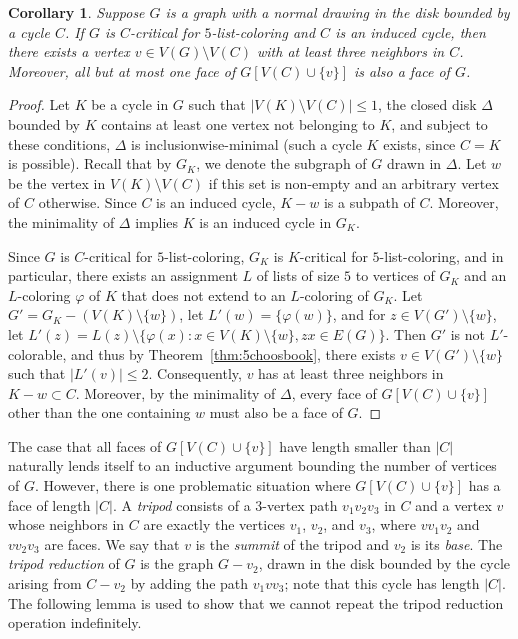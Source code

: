 \documentclass[12pt,twoside,openright,a4paper]{book}
\newtheorem{corollary}[theorem]{Corollary}
\begin{document}
\begin{corollary}\label{cor:tripod}
Suppose $G$ is a graph with a normal drawing in the disk bounded by a cycle $C$.
If $G$ is $C$-critical for $5$-list-coloring and $C$ is an induced cycle, then
there exists a vertex $v\in V(G)\setminus V(C)$ with at least three neighbors in $C$.
Moreover, all but at most one face of $G[V(C)\cup\{v\}]$ is also a face of $G$.
\end{corollary}
\begin{proof}
Let $K$ be a cycle in $G$ such that $|V(K)\setminus V(C)|\le 1$, the closed disk $\Delta$ bounded
by $K$ contains at least one vertex not belonging to $K$, and subject to these conditions, $\Delta$ is inclusionwise-minimal
(such a cycle $K$ exists, since $C=K$ is possible).  Recall that by $G_K$, we denote the subgraph of $G$ drawn in $\Delta$.
Let $w$ be the vertex in $V(K)\setminus V(C)$ if this set is non-empty and an arbitrary vertex of $C$ otherwise.
Since $C$ is an induced cycle, $K-w$ is a subpath of $C$.  Moreover, the minimality of $\Delta$ implies $K$ is an induced
cycle in $G_K$.

Since $G$ is $C$-critical for $5$-list-coloring, $G_K$ is $K$-critical for $5$-list-coloring, and in particular,
there exists an assignment $L$ of lists of size $5$ to vertices of $G_K$ and an $L$-coloring $\varphi$ of $K$
that does not extend to an $L$-coloring of $G_K$.  Let $G'=G_K-(V(K)\setminus \{w\})$, let $L'(w)=\{\varphi(w)\}$,
and for $z\in V(G')\setminus\{w\}$, let $L'(z)=L(z)\setminus \{\varphi(x):x\in V(K)\setminus\{w\},zx\in E(G)\}$.
Then $G'$ is not $L'$-colorable, and thus by Theorem~\ref{thm:5choosbook}, there exists $v\in V(G')\setminus\{w\}$
such that $|L'(v)|\le 2$.  Consequently, $v$ has at least three neighbors in $K-w\subset C$.  Moreover,
by the minimality of $\Delta$, every face of $G[V(C)\cup \{v\}]$ other than the one containing $w$ must also
be a face of $G$.
\end{proof}

The case that all faces of $G[V(C)\cup\{v\}]$ have length smaller than $|C|$ naturally lends itself to an inductive argument
bounding the number of vertices of $G$.  However, there is one problematic situation where $G[V(C)\cup\{v\}]$ has a face of length $|C|$.
A \emph{tripod} consists of a $3$-vertex path $v_1v_2v_3$ in $C$ and a vertex $v$ whose neighbors in $C$ are exactly the vertices
$v_1$, $v_2$, and $v_3$, where $vv_1v_2$ and $vv_2v_3$ are faces.  We say that $v$ is the \emph{summit} of the tripod and $v_2$ is its \emph{base}.
The \emph{tripod reduction} of $G$ is the graph $G-v_2$, drawn in the disk bounded by the cycle arising from $C-v_2$ by adding the path
$v_1vv_3$; note that this cycle has length $|C|$.  The following lemma is used to show that we cannot repeat the
tripod reduction operation indefinitely.
\end{document}
